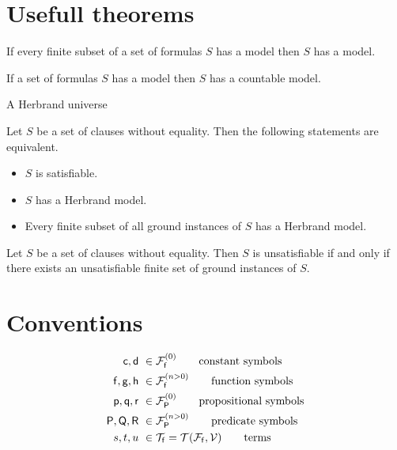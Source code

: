 \section{Usefull theorems}

\begin{theorem}[Compactness]\label{the:compactness}
	If every finite subset of a set of formulas $S$ has a model then $S$ has a model. 
\end{theorem}

\begin{theorem}\label{the:loewenheim}
	If a set of formulas $S$ has a model then $S$ has a countable model.
\end{theorem}

\begin{definition}
A Herbrand universe 
\end{definition}

\begin{definition}
	
\end{definition}

\begin{theorem}[Herbrand]\label{the:herbrand}
	Let $S$ be a set of clauses without equality. Then the following statements are equivalent.
	\begin{itemize}
		\item $S$ is satisfiable.
		\item $S$ has a Herbrand model.
		\item Every finite subset of all ground instances of $S$ has a Herbrand model.
	\end{itemize} 
\end{theorem}

\begin{corollary}
	Let $S$ be a set of clauses without equality. 
	Then $S$ is unsatisfiable if and only if there exists 
	an unsatisfiable finite set of ground instances of $S$.
\end{corollary}

\section{Conventions}

\begin{align*}
\mc, \md &\ \in\mcFfn[{0}]\tag*{constant symbols} \\
\mf, \mg, \mh &\ \in\mcFfn[{n>0}]\tag*{function symbols} \\
\mpp, \mq, \mr &\ \in\mcFPn[{0}]\tag*{propositional symbols}\\
\mP, \mQ, \mR &\ \in\mcFPn[{n>0}]\tag*{predicate symbols}\\
s,t,u &\ \in\mcTf = \mcTFfV\tag*{terms}
\end{align*}


